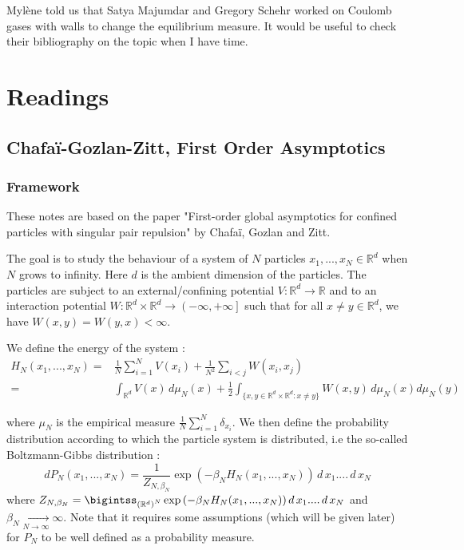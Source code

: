 \documentclass[a4paper,12pt]{report}
\begin{document}
Mylène told us that Satya Majumdar and Gregory Schehr worked on Coulomb gases with walls to change the equilibrium measure. It would be useful to check their bibliography on the topic when I have time.

\chapter{Readings}

\section{Chafa\"i-Gozlan-Zitt, First Order Asymptotics}\label{Chafai-Gozlan-Zitt}

\subsection{Framework}

These notes are based on the paper "First-order global asymptotics for confined particles with singular pair repulsion" by Chafaï, Gozlan and Zitt. \cite{chafai-gozlan-zitt}

The goal is to study the behaviour of a system of $N$ particles $x_1, ..., x_N \in \mathbb{R}^{d}$ when $N$ grows to infinity. Here $d$ is the ambient dimension of the particles. The particles are subject to an external/confining potential $V : \mathbb{R}^{d} \longrightarrow \mathbb{R}$ and to an interaction potential $W : \mathbb{R}^{d} \times \mathbb{R}^{d} \longrightarrow \left(-\infty, +\infty\right]$ such that for all $x \neq y \in \mathbb{R}^{d}$, we have $W(x, y) = W(y, x) < \infty$.

We define the energy of the system :
\begin{align*}
    H_{N}\left(x_1, ..., x_N\right) =& \frac{1}{N}\sum\limits_{i =1}^{N} V(x_i) + \frac{1}{N^2}\sum\limits_{i < j} W(x_i, x_j)\\
    =& \int_{\mathbb{R}^{d}} V(x) \,d\mu_{N}(x) + \frac{1}{2} \int_{\{x, y \in \mathbb{R}^{d}\times \mathbb{R}^{d} : x \neq y\}} W(x, y)\, d\mu_{N}(x) d\mu_{N}(y) 
\end{align*}

where $\mu_{N}$ is the empirical measure $\frac{1}{N}\sum\limits_{i=1}^{N} \delta_{x_i}$. We then define the probability distribution according to which the particle system is distributed, i.e the so-called Boltzmann-Gibbs distribution :
\[dP_{N}(x_1, ..., x_N) = \frac{1}{Z_{N, \beta_{N}}} \exp{\left(-\beta_{N} H_{N}(x_1, ..., x_N)\right)}\,d\,x_{1}....\,d\,x_{N}\]
where $Z_{N, \beta_{N}} = \bigintss_{\left(\mathbb{R}^{d}\right)^{N}} \exp{\left(-\beta_{N} H_{N}(x_1, ..., x_N)\right)}\,d\,x_{1}....\,d\,x_{N}$ and $\beta_{N} \underset{N \longrightarrow \infty}{\longrightarrow} \infty$. Note that it requires some assumptions (which will be given later) for $P_{N}$ to be well defined as a probability measure.
\vspace{0.5cm}
\end{document}
